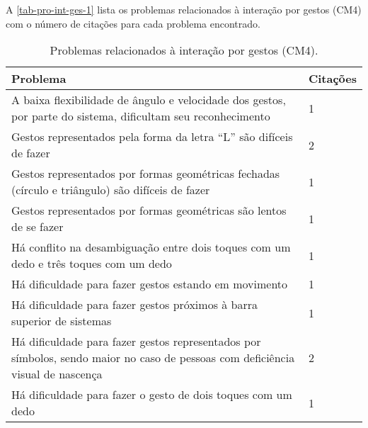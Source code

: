 A \autoref{tab-pro-int-ges-1} lista os problemas relacionados à interação por gestos (CM4) com o número de citações para cada problema encontrado.

\begin{table}[htb]
  \begin{center}
    \ABNTEXfontereduzida
    \caption{Problemas relacionados à interação por gestos (CM4).}
    \label{tab-pro-int-ges-1}
    \begin{tabular}{p{13.1cm}|p{1.4cm}}
      \textbf{Problema}                                                                                                                        & \textbf{Citações} \\
      \hline
      A baixa flexibilidade de ângulo e velocidade dos gestos, por parte do sistema, dificultam seu reconhecimento                             & 1                 \\
      \hline
      Gestos representados pela forma da letra “L” são difíceis de fazer                                                                       & 2                 \\
      \hline
      Gestos representados por formas geométricas fechadas (círculo e triângulo) são difíceis de fazer                                         & 1                 \\
      \hline
      Gestos representados por formas geométricas são lentos de se fazer                                                                       & 1                 \\
      \hline
      Há conflito na desambiguação entre dois toques com um dedo e três toques com um dedo                                                     & 1                 \\
      \hline
      Há dificuldade para fazer gestos estando em movimento                                                                                    & 1                 \\
      \hline
      Há dificuldade para fazer gestos próximos à barra superior de sistemas                                                                   & 1                 \\
      \hline
      Há dificuldade para fazer gestos representados por símbolos, sendo maior no caso de pessoas com deficiência visual de nascença           & 2                 \\
      \hline
      Há dificuldade para fazer o gesto de dois toques com um dedo                                                                             & 1                 \\

\end{tabular}
\end{center}
\end{table}
